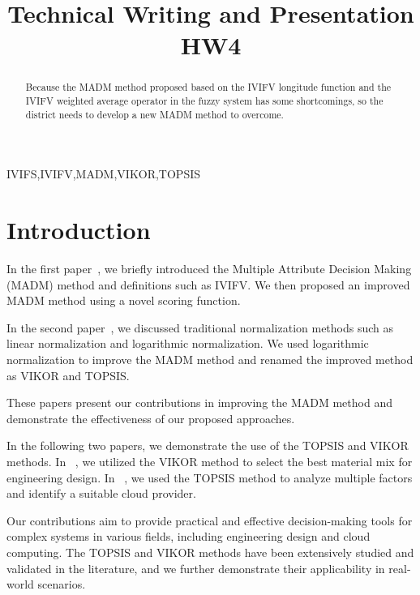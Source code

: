 \documentclass[twocolumn]{IEEEtran}
\begin{document}
\title{Technical Writing and Presentation HW4}

\author{
}

\maketitle

\begin{abstract}
Because the MADM method proposed based on the IVIFV longitude function and the IVIFV weighted average operator in the fuzzy system has some shortcomings, so the district needs to develop a new MADM method to overcome.
\end{abstract}

\begin{IEEEkeywords}
IVIFS,IVIFV,MADM,VIKOR,TOPSIS
\end{IEEEkeywords}

\section{Introduction}

In the first paper~\cite{chen2022}, we briefly introduced the Multiple Attribute Decision Making (MADM) method and definitions such as IVIFV. We then proposed an improved MADM method using a novel scoring function.

In the second paper~\cite{Sarfaraz2020}, we discussed traditional normalization methods such as linear normalization and logarithmic normalization. We used logarithmic normalization to improve the MADM method and renamed the improved method as VIKOR and TOPSIS.

These papers present our contributions in improving the MADM method and demonstrate the effectiveness of our proposed approaches.

In the following two papers, we demonstrate the use of the TOPSIS and VIKOR methods. In ~\cite{Chandrika2022}, we utilized the VIKOR method to select the best material mix for engineering design. In ~\cite{Thasni2020}, we used the TOPSIS method to analyze multiple factors and identify a suitable cloud provider.

Our contributions aim to provide practical and effective decision-making tools for complex systems in various fields, including engineering design and cloud computing. The TOPSIS and VIKOR methods have been extensively studied and validated in the literature, and we further demonstrate their applicability in real-world scenarios.
\end{document}
